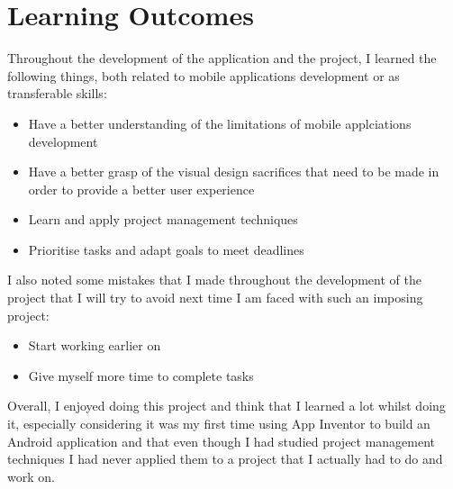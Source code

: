 \chapter{Learning Outcomes}
Throughout the development of the application and the project, I learned the following things, both related to mobile applications development or as transferable skills:

\begin{itemize}
  \item Have a better understanding of the limitations of mobile applciations development
  \item Have a better grasp of the visual design sacrifices that need to be made in order to provide a better user experience
  \item Learn and apply project management techniques
  \item Prioritise tasks and adapt goals to meet deadlines
\end{itemize}

I also noted some mistakes that I made throughout the development of the project that I will try to avoid next time I am faced with such an imposing project:
\begin{itemize}
  \item Start working earlier on
  \item Give myself more time to complete tasks
\end{itemize}

Overall, I enjoyed doing this project and think that I learned a lot whilst doing it, especially considering it was my first time using App Inventor to build an Android application and that even though I had studied project management techniques I had never applied them to a project that I actually had to do and work on.
